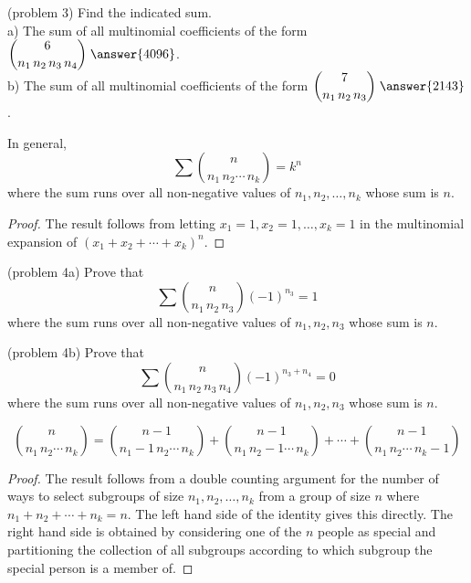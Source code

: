 \documentclass[handout]{ximera}
\begin{document}
\begin{problem}(problem 3)
Find the indicated sum.\\
a) The sum of all multinomial coefficients of the form $\dis \binom{6}{n_1\, n_2\, n_3\, n_4}\; \answer{4096}$.\\[8pt]
b) The sum of all multinomial coefficients of the form $\dis \binom{7}{n_1\, n_2\, n_3} \; \answer{2143}$.\\

\end{problem}
 
\begin{proposition}
In general,
\[
\sum \binom{n}{n_1 \, n_2 \cdots \, n_k} = k^n
\]
where the sum runs over all non-negative values of $n_1, n_2, \dots, n_k$ whose sum is $n$.
\end{proposition}

\begin{proof}
The result follows from letting $x_1 = 1, x_2 = 1, \dots, x_k = 1$ in the multinomial expansion of 
$(x_1 + x_2 + \cdots + x_k)^n$.
\end{proof}

\begin{problem}(problem 4a)
Prove that
\[
\sum \binom{n}{n_1 \, n_2 \, n_3} (-1)^{n_3} = 1
\]
where the sum runs over all non-negative values of $n_1, n_2, n_3$ whose sum is $n$.
\end{problem}

\begin{problem}(problem 4b)
Prove that
\[
\sum \binom{n}{n_1 \, n_2 \, n_3 \, n_4} (-1)^{n_3 + n_4} = 0
\]
where the sum runs over all non-negative values of $n_1, n_2, n_3$ whose sum is $n$.
\end{problem}



\begin{proposition}
\[
\binom{n}{n_1 \, n_2 \cdots \, n_k} = \binom{n-1}{n_1 -1 \, n_2 \cdots \, n_k} + \binom{n-1}{n_1 \, n_2 -1 \cdots \, n_k} + \cdots+ \binom{n-1}{n_1 \, n_2 \cdots \, n_k -1 }
\]
\end{proposition}

\begin{proof}
The result follows from a double counting argument for the number of ways to select 
subgroups of size $n_1, n_2, \dots, n_k$ from a group of size $n$ where $n_1 + n_2 + \cdots + n_k = n$. 
The left hand side of the identity gives this directly.  The right hand side is obtained by 
considering one of the $n$ people as special and partitioning the collection of all subgroups 
according to which subgroup the special person is a member of.
\end{proof}



\end{document}
